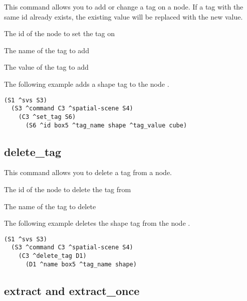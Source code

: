 This command allows you to add or change a tag on a node.
If a tag with the same id already exists, 
the existing value will be replaced with the new value.

\begin{description}
	\item{} The id of the node to set the tag on
	\item{} The name of the tag to add
	\item{} The value of the tag to add
\end{description}

The following example adds a shape tag to the node .

\begin{verbatim}
(S1 ^svs S3)
  (S3 ^command C3 ^spatial-scene S4)
    (C3 ^set_tag S6)
      (S6 ^id box5 ^tag_name shape ^tag_value cube)
\end{verbatim}


\subsection{delete\_tag}

This command allows you to delete a tag from a node.

\begin{description}
	\item{} The id of the node to delete the tag from
	\item{} The name of the tag to delete
\end{description}

The following example deletes the shape tag from the node .

\begin{verbatim}
(S1 ^svs S3)
  (S3 ^command C3 ^spatial-scene S4)
    (C3 ^delete_tag D1)
      (D1 ^name box5 ^tag_name shape)
\end{verbatim}


\subsection{extract and extract\_once}

